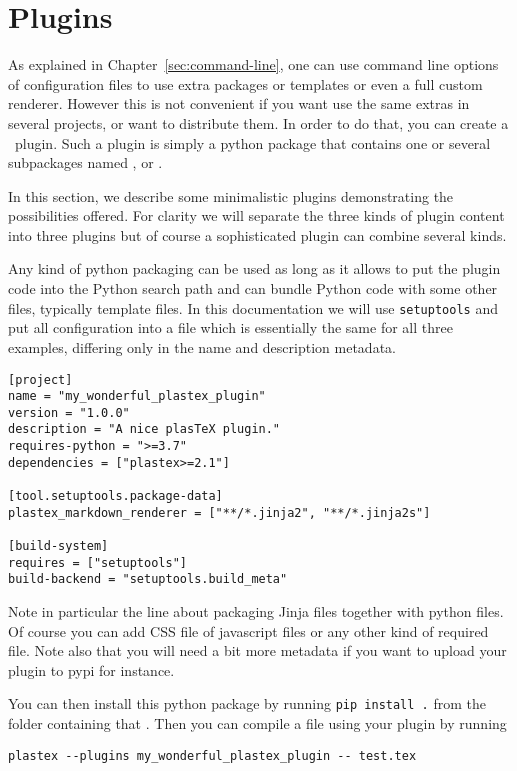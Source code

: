 \section{Plugins}
\label{sec:plugins}

As explained in Chapter~\ref{sec:command-line}, one can use command line
options of configuration files to use extra packages or templates or even a
full custom renderer.
However this is not convenient if you want use the same extras in several
projects, or want to distribute them. In order to do that, you can create a
\plasTeX\ plugin. Such a plugin is simply a python package that contains
one or several subpackages named ,  or
.

In this section, we describe some minimalistic plugins demonstrating the
possibilities offered. For clarity we will separate the three kinds of plugin content
into three plugins but of course a sophisticated plugin can combine several kinds.

Any kind of python packaging can be used as long as it allows to put the plugin code into
the Python search path and can bundle Python code with some other files, typically template files.
In this documentation we will use \texttt{setuptools} and put all configuration into
a  file which is essentially the same for all three examples,
differing only in the name and description metadata.
\begin{lstlisting}
[project]
name = "my_wonderful_plastex_plugin"
version = "1.0.0"
description = "A nice plasTeX plugin."
requires-python = ">=3.7"
dependencies = ["plastex>=2.1"]

[tool.setuptools.package-data]
plastex_markdown_renderer = ["**/*.jinja2", "**/*.jinja2s"]

[build-system]
requires = ["setuptools"]
build-backend = "setuptools.build_meta"
\end{lstlisting}

Note in particular the line about packaging Jinja files together with python files. Of course
you can add CSS file of javascript files or any other kind of required file.
Note also that you will need a bit more metadata if you want to upload your
plugin to pypi for instance.

You can then install this python package by running \verb+pip install .+ from the folder
containing that . Then you can compile a file  using your plugin by running

\begin{verbatim}
plastex --plugins my_wonderful_plastex_plugin -- test.tex
\end{verbatim}

